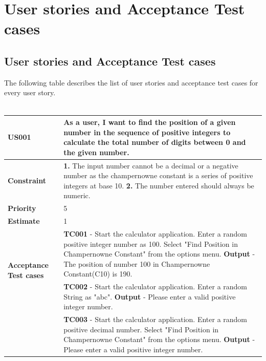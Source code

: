 \documentclass[12pt, a4paper]{report}
\begin{document}
\chapter{User stories and Acceptance Test cases}
\section{User stories and Acceptance Test cases}
The following table describes the list of user stories and acceptance test cases for every user story.
\\\\
\begin{tabular}{|p{3cm}|p{12cm}|}
\hline
     \textbf{US001} &  As a user, I want to find the position of a given number in the sequence of positive integers to calculate the total number of digits between 0 and the given number.\\\hline
     \textbf{Constraint} &  \textbf{1. } The input number cannot be a decimal or a negative number as the champernowne constant is a series of positive integers at base 10. \newline \textbf{2. } The number entered should always be numeric.\\\hline
     \textbf{Priority} & 5 \\\hline
     \textbf{Estimate} & 1 \\\hline
     \multirow{2}{3cm}{\textbf{Acceptance Test cases}} & \textbf{TC001} - Start the calculator application. Enter a random positive integer number as 100. Select "Find Position in Champernowne Constant" from the options menu. \newline \textbf{Output} - The position of number 100 in Champernowne Constant(C10) is 190.\\\cline{2-2}
     & \textbf{TC002} - Start the calculator application. Enter a random String as "abc". \newline \textbf{Output} - Please enter a valid positive integer number.\\\cline{2-2}
     & \textbf{TC003} - Start the calculator application. Enter a random positive decimal number. Select "Find Position in Champernowne Constant" from the options menu. \newline \textbf{Output} - Please enter a valid positive integer number.\\\hline
\end{tabular}
\\\\\\
\end{document}
